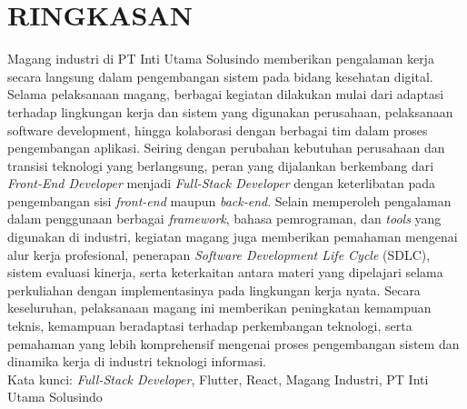 \chapter*{RINGKASAN} 
\begin{singlespace}
    {\noindent
        Magang industri di PT Inti Utama Solusindo memberikan pengalaman kerja secara langsung dalam pengembangan sistem pada bidang kesehatan digital. Selama pelaksanaan magang, berbagai kegiatan dilakukan mulai dari adaptasi terhadap lingkungan kerja dan sistem yang digunakan perusahaan, pelaksanaan software development, hingga kolaborasi dengan berbagai tim dalam proses pengembangan aplikasi. Seiring dengan perubahan kebutuhan perusahaan dan transisi teknologi yang berlangsung, peran yang dijalankan berkembang dari \textit{Front-End Developer} menjadi \textit{Full-Stack Developer} dengan keterlibatan pada pengembangan sisi \textit{front-end} maupun \textit{back-end}. Selain memperoleh pengalaman dalam penggunaan berbagai \textit{framework}, bahasa pemrograman, dan \textit{tools} yang digunakan di industri, kegiatan magang juga memberikan pemahaman mengenai alur kerja profesional, penerapan \textit{Software Development Life Cycle} (SDLC), sistem evaluasi kinerja, serta keterkaitan antara materi yang dipelajari selama perkuliahan dengan implementasinya pada lingkungan kerja nyata. Secara keseluruhan, pelaksanaan magang ini memberikan peningkatan kemampuan teknis, kemampuan beradaptasi terhadap perkembangan teknologi, serta pemahaman yang lebih komprehensif mengenai proses pengembangan sistem dan dinamika kerja di industri teknologi informasi.\\[12pt]

        \noindent
        Kata kunci: \textit{Full-Stack Developer},
        Flutter, React, Magang Industri, PT Inti Utama Solusindo}

\end{singlespace}
